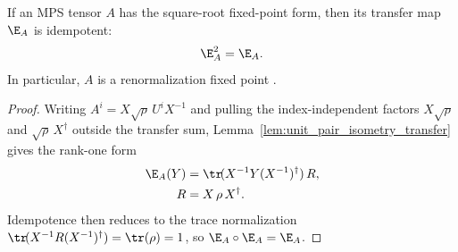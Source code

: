 \begin{lemma}%
    \label{thm:is_rfp_of_isometry_canonical_form}
    \leanok
    If an MPS tensor $A$ has the square-root fixed-point form, then its transfer map $\E_A$ is idempotent:
    \begin{align}
        \E_A^2 = \E_A.
        \notag
    \end{align}
    In particular, $A$ is a renormalization fixed point \cite[Section~3]{Cirac2016MPDO_arXiv}.
\end{lemma}
\begin{proof}\leanok
    Writing $A^i = X\sqrt\rho\,U^i X^{-1}$ and pulling the index-independent
    factors $X\sqrt\rho$ and $\sqrt\rho\,X^\dagger$ outside the transfer sum,
    Lemma~\ref{lem:unit_pair_isometry_transfer} gives the rank-one form
    \begin{align}
        \E_A(Y)
         & = \tr\!(X^{-1} Y (X^{-1})^\dagger)\,R,
        \notag                                    \\
        R
         & = X\,\rho\,X^\dagger.
        \notag
    \end{align}
    Idempotence then reduces to the trace normalization
    $\tr\!(X^{-1} R (X^{-1})^\dagger) = \tr(\rho) = 1$, so
    $\E_A \circ \E_A = \E_A$.
\end{proof}

